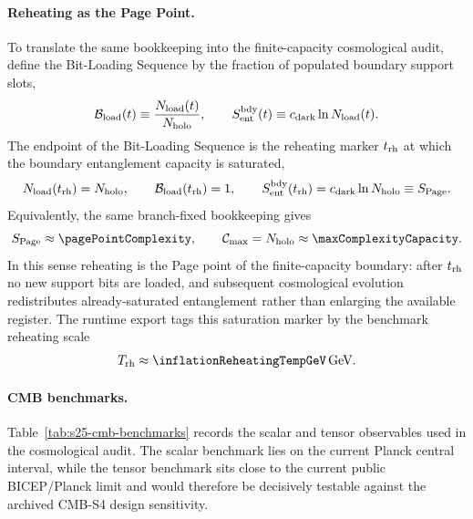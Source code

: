 \documentclass[11pt]{article}
\begin{document}
\paragraph{Reheating as the Page Point.}
To translate the same bookkeeping into the finite-capacity cosmological audit,
define the Bit-Loading Sequence by the fraction of populated boundary support
slots,
\begin{equation}
 \mathcal B_{\rm load}(t)
 \equiv
 \frac{N_{\rm load}(t)}{N_{\rm holo}},
 \qquad
 S_{\rm ent}^{\rm bdy}(t)
 \equiv
 c_{\rm dark}\ln N_{\rm load}(t).
\end{equation}
The endpoint of the Bit-Loading Sequence is the reheating marker $t_{\rm rh}$ at
which the boundary entanglement capacity is saturated,
\begin{equation}
 N_{\rm load}(t_{\rm rh})=N_{\rm holo},
 \qquad
 \mathcal B_{\rm load}(t_{\rm rh})=1,
 \qquad
 S_{\rm ent}^{\rm bdy}(t_{\rm rh})=c_{\rm dark}\ln N_{\rm holo}\equiv S_{\rm Page}.
\end{equation}
Equivalently, the same branch-fixed bookkeeping gives
\begin{equation}
 S_{\rm Page}\approx\pagePointComplexity,
 \qquad
 \mathcal C_{\max}=N_{\rm holo}\approx\maxComplexityCapacity.
\end{equation}
In this sense reheating is the Page point of the finite-capacity boundary:
after $t_{\rm rh}$ no new support bits are loaded, and subsequent cosmological
evolution redistributes already-saturated entanglement rather than enlarging
the available register. The runtime export tags this saturation marker by the
benchmark reheating scale
\begin{equation}
 T_{\rm rh}\approx\inflationReheatingTempGeV\,\mathrm{GeV}.
\end{equation}

\paragraph{CMB benchmarks.}
Table~\ref{tab:s25-cmb-benchmarks} records the scalar and tensor observables
used in the cosmological audit. The scalar benchmark lies on the current
Planck central interval, while the tensor benchmark sits close to the current
public BICEP/Planck limit and would therefore be decisively testable against
the archived CMB-S4 design sensitivity.
\end{document}
